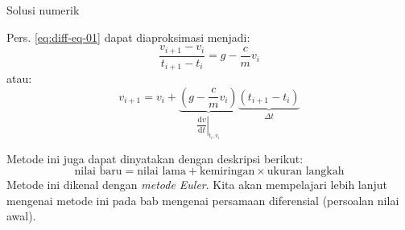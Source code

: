 \begin{frame}{Solusi numerik}

\fontsize{9pt}{10pt}\selectfont

Pers. \eqref{eq:diff-eq-01} dapat
diaproksimasi menjadi:
\begin{equation*}
\frac{v_{i+1} - v_{i}}{t_{i+1} - t_{i}} = g - \frac{c}{m} v_{i}
\end{equation*}
atau:
\begin{equation*}
v_{i+1} = v_{i} + \underbrace{\left( g - \frac{c}{m} v_{i} \right)}_{
  \left.\dfrac{\mathrm{d}v}{\mathrm{d}t}\right|_{t_{i},v_{i}}
}
\underbrace{\left( t_{i+1} - t_{i} \right)}_{\Delta t}
\end{equation*}

Metode ini juga dapat dinyatakan dengan deskripsi berikut:
\begin{equation*}
\text{nilai baru} = \text{nilai lama} + \text{kemiringan}\times\text{ukuran langkah}
\end{equation*}
Metode ini dikenal dengan \emph{metode Euler}. Kita akan mempelajari
lebih lanjut mengenai metode ini pada bab mengenai persamaan diferensial
(persoalan nilai awal).
\end{frame}



